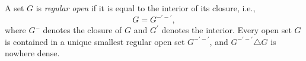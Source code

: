 A set $G$ is \emph{regular open} if it is equal to the interior of its closure, i.e.,
$$G = G^{-'-'},$$
where $G^{-}$ denotes the closure of $G$ and $G^{'}$ denotes the interior. Every open set $G$ is contained in a unique smallest regular open set $G^{-'-'}$, and $G^{-'-'} \triangle G$ is nowhere dense.

